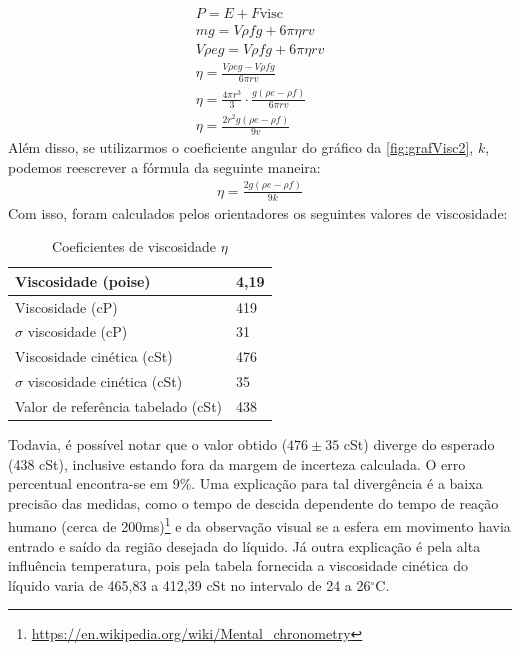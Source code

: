 \begin{align*}
    P = E + F\text{visc}
    \\
    mg = V \rho f g + 6 \pi \eta r v
    \\
    V \rho e g =  V \rho f g + 6 \pi \eta r v
    \\
    \eta = \frac{V \rho e g - V \rho f g}{6 \pi r v}
    \\
    \eta = \frac{4 \pi r^3}{3}\cdot \frac{ g (\rho e - \rho f)}{ 6 \pi r v}
    \\
    \eta = \frac{2 r^2 g (\rho e - \rho f)}{ 9 v}
\end{align*}
Além disso, se utilizarmos o coeficiente angular do gráfico da
\cref{fig:grafVisc2}, \(k\), podemos reescrever a fórmula da seguinte maneira:
\begin{align*}
    \eta = \frac{2 g (\rho e - \rho f)}{ 9 k}
\end{align*}
Com isso, foram calculados pelos orientadores os seguintes valores de viscosidade:
\begin{table}[H]
    \centering
    \caption{Coeficientes de viscosidade \(\eta\)}
    \begin{tabular}{|l|l|}
        \hline
        Viscosidade (poise) & 4,19  \\ \hline
        Viscosidade (cP) & 419 \\ \hline
        \(\sigma\) viscosidade (cP) & 31  \\ \hline
        Viscosidade cinética (cSt) & 476   \\ \hline
        \(\sigma\) viscosidade cinética (cSt) & 35  \\ \hline
        Valor de referência tabelado (cSt) & 438  \\ \hline
    \end{tabular}
\end{table}
Todavia, é possível notar que o valor obtido (\(476 \pm 35\) cSt) diverge do esperado (438 cSt), inclusive estando fora da margem de incerteza calculada. O erro percentual encontra-se em 9\%. Uma explicação para tal divergência é a baixa precisão das medidas, como o tempo de descida dependente do tempo de reação humano (cerca de 200ms)\footnote{\url{https://en.wikipedia.org/wiki/Mental_chronometry}} e da observação visual se a esfera em movimento havia entrado e saído da região desejada do líquido. Já outra explicação é pela alta influência temperatura, pois pela tabela fornecida a viscosidade cinética do líquido varia de 465,83 a 412,39 cSt no intervalo de 24 a 26\(^\circ\)C.



